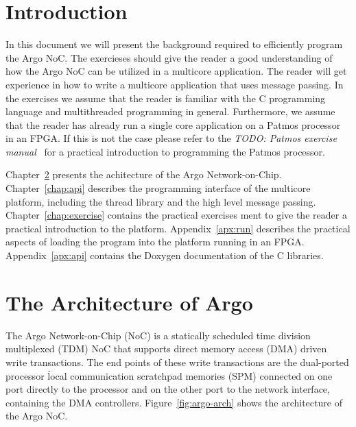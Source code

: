 \documentclass[a4paper,fontsize=10pt,twoside,DIV15,BCOR12mm,headinclude=true,footinclude=false,pagesize,bibtotoc]{scrbook}
\newcommand{\todo}[1]{{\emph{TODO: #1}}}
\begin{document}
\chapter{Introduction}

In this document we will present the background required to efficiently program the Argo NoC.
The exercieses should give the reader a good understanding of how the Argo NoC can be utilized in a multicore application.
The reader will get experience in how to write a multicore application that uses message passing.
In the exercises we assume that the reader is familiar with the C programming language and multithreaded programming in general.
Furthermore, we assume that the reader has already run a single core application on a Patmos processor in an FPGA. If this is not the case please refer to the \todo{Patmos exercise manual~\cite{}} for a practical introduction to programming the Patmos processor.


Chapter~\ref{chap:arch} presents the achitecture of the Argo Network-on-Chip.
Chapter~\ref{chap:api} describes the programming interface of the multicore platform, including the thread library and the high level message passing.
Chapter~\ref{chap:exercise} contains the practical exercises ment to give the reader a practical introduction to the platform.
Appendix~\ref{apx:run} describes the practical aspects of loading the program into the platform running in an FPGA.
Appendix~\ref{apx:api} contains the Doxygen documentation of the C libraries.


\chapter{The Architecture of Argo}
\label{chap:arch}
The Argo Network-on-Chip (NoC) is a statically scheduled
time division multiplexed (TDM) NoC that supports
direct memory access (DMA) driven write transactions.
The end points of these write transactions are the dual-ported
processor ĺocal communication scratchpad memories (SPM) connected
on one port directly to the processor and on the other port to the 
network interface, containing the DMA controllers.
Figure~\ref{fig:argo-arch} shows the architecture of the Argo NoC.
\end{document}
